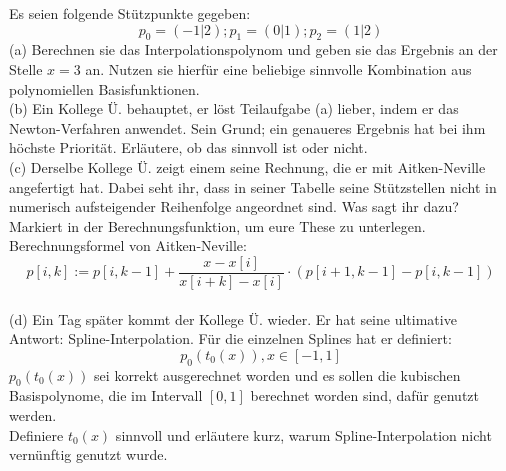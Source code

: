 \documentclass{scrartcl}
\begin{document}
	Es seien folgende Stützpunkte gegeben:
	$$p_0 = (-1 | 2); p_1 = (0 | 1); p_2 = (1 | 2)$$
	(a)
	Berechnen sie das Interpolationspolynom und geben sie das Ergebnis an der Stelle $x = 3$ an. Nutzen sie hierfür eine beliebige sinnvolle Kombination aus polynomiellen Basisfunktionen.
	\\
	(b)
	Ein Kollege Ü. behauptet, er löst Teilaufgabe (a) lieber, indem er das Newton-Verfahren anwendet. Sein Grund; ein genaueres Ergebnis hat bei ihm höchste Priorität. Erläutere, ob das sinnvoll ist oder nicht.
	 \lbreak
	\\
	(c)
	Derselbe Kollege Ü. zeigt einem seine Rechnung, die er mit Aitken-Neville angefertigt hat. Dabei seht ihr, dass in seiner Tabelle seine Stützstellen nicht in numerisch aufsteigender Reihenfolge angeordnet sind. Was sagt ihr dazu? Markiert in der Berechnungsfunktion, um eure These zu unterlegen. \\
	Berechnungsformel von Aitken-Neville:
	$$p[i,k] := p[i, k-1] + \frac{x-x[i]}{x[i+k]-x[i]} \cdot (p[i+1, k-1] - p[i, k-1])$$
	 \lbreak
	\\
	(d)
	Ein Tag später kommt der Kollege Ü. wieder. Er hat seine ultimative Antwort: Spline-Interpolation. Für die einzelnen Splines hat er definiert:
	$$p_0(t_0(x)), x \in [-1, 1]$$
	$p_0(t_0(x))$ sei korrekt ausgerechnet worden und es sollen die kubischen Basispolynome, die im Intervall $[0, 1]$ berechnet worden sind, dafür genutzt werden. \sbreak \\
	Definiere $t_0(x)$ sinnvoll und erläutere kurz, warum Spline-Interpolation nicht vernünftig genutzt wurde.
\end{document}
